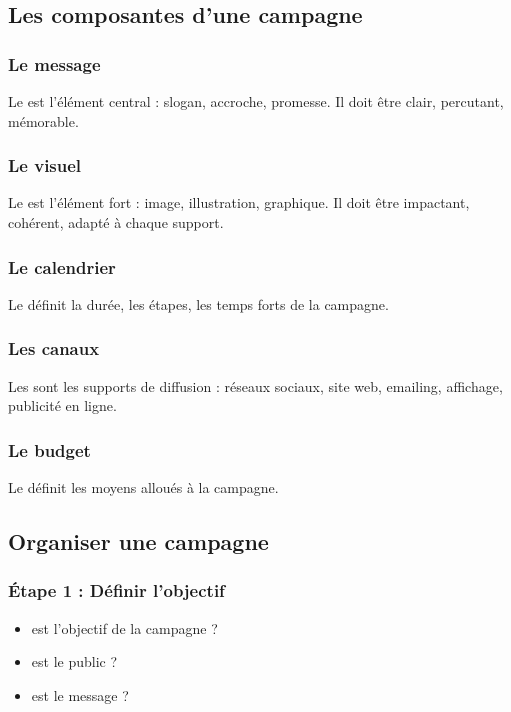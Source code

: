 \subsection{Les composantes d'une campagne}

\subsubsection{Le message}

Le  est l'élément central : slogan, accroche, promesse. Il doit être clair, percutant, mémorable.

\subsubsection{Le visuel}

Le  est l'élément fort : image, illustration, graphique. Il doit être impactant, cohérent, adapté à chaque support.

\subsubsection{Le calendrier}

Le  définit la durée, les étapes, les temps forts de la campagne.

\subsubsection{Les canaux}

Les  sont les supports de diffusion : réseaux sociaux, site web, emailing, affichage, publicité en ligne.

\subsubsection{Le budget}

Le  définit les moyens alloués à la campagne.

\subsection{Organiser une campagne}

\subsubsection{Étape 1 : Définir l'objectif}

\begin{itemize}
    \item {} est l'objectif de la campagne ?
    \item {} est le public ?
    \item {} est le message ?
\end{itemize}

